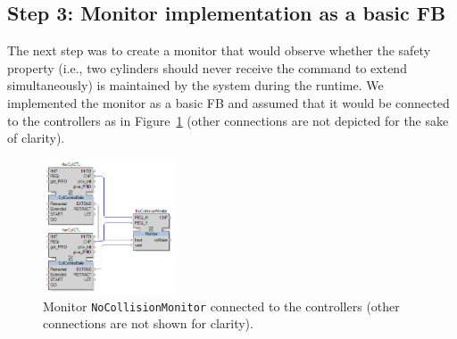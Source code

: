 \begin{bibunit}



\subsection{Step 3: Monitor implementation as a basic FB}


The next step was to create a monitor that would observe whether the safety property (i.e., two cylinders should never receive the command to extend simultaneously) is maintained by the system during the runtime. We implemented the monitor as a basic FB and assumed that it would be connected to the controllers as in Figure~\ref{fig:monitorplacement} (other connections are not depicted for the sake of clarity).


\begin{figure}[h!]
    \centering
    \includegraphics[width=0.35\textwidth]{MX_Papers/Paper3/pic/monitorplacement.png}
    \caption{Monitor \texttt{NoCollisionMonitor} connected to the controllers (other connections are not shown for clarity).}
    \label{fig:monitorplacement}
\end{figure}


\end{bibunit}
